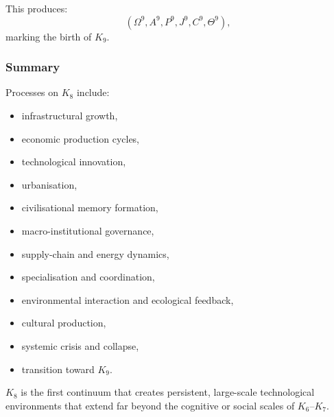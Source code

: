 This produces:
\[
(\Omega^9, A^9, P^9, J^9, C^9, \Theta^9),
\]
marking the birth of $K_9$.

\subsubsection{Summary}

Processes on $K_8$ include:
\begin{itemize}
    \item infrastructural growth,
    \item economic production cycles,
    \item technological innovation,
    \item urbanisation,
    \item civilisational memory formation,
    \item macro-institutional governance,
    \item supply-chain and energy dynamics,
    \item specialisation and coordination,
    \item environmental interaction and ecological feedback,
    \item cultural production,
    \item systemic crisis and collapse,
    \item transition toward $K_9$.
\end{itemize}

$K_8$ is the first continuum that creates persistent, large-scale
technological environments that extend far beyond the cognitive or
social scales of $K_6$–$K_7$.

